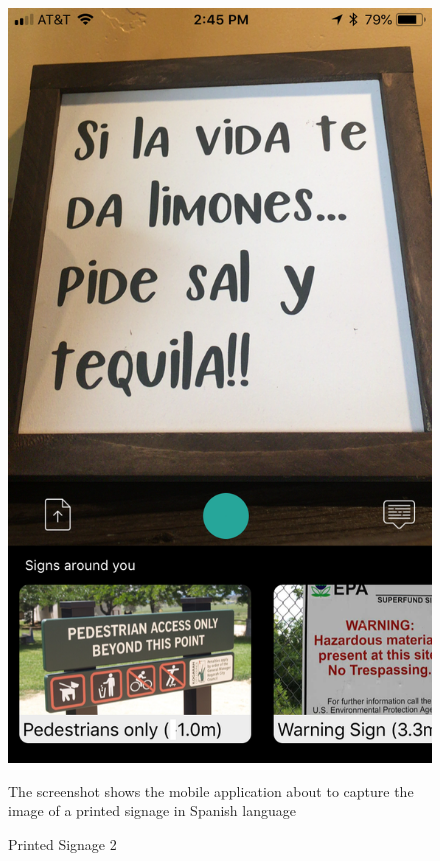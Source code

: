 \documentclass[12pt]{article}
\begin{document}
 \begin{figure} [H]
\centering
\begin{minipage}{.5\textwidth}
  \centering
  \includegraphics[width=0.9\linewidth]{media/case4.png}
  \caption{Printed Signage 2}{The screenshot shows the mobile application about to capture the image of a printed signage in Spanish language}
  \label{fig:case4in}
\end{minipage}%
\begin{minipage}{.5\textwidth}
  \centering

\end{minipage}
\end{figure}
\end{document}

